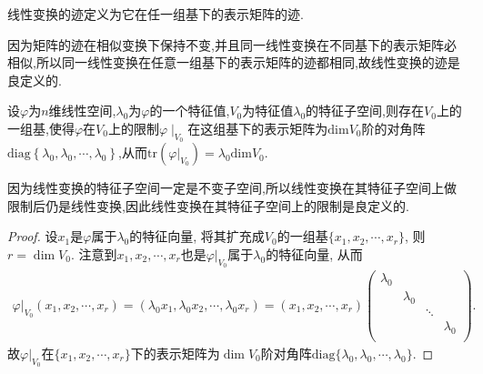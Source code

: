 \documentclass[../../main.tex]{subfiles}
\begin{document}
\begin{definition}[线性变换的迹]
线性变换的迹定义为它在任一组基下的表示矩阵的迹.
\end{definition}
\begin{note}
因为矩阵的迹在相似变换下保持不变,并且同一线性变换在不同基下的表示矩阵必相似,所以同一线性变换在任意一组基下的表示矩阵的迹都相同,故线性变换的迹是良定义的.
\end{note}

\begin{proposition}\label{proposition:线性变换在其特征子空间上的限制的表示矩阵及迹}
设$\varphi$为$n$维线性空间,$\lambda_0$为$\varphi$的一个特征值,$V_0$为特征值$\lambda_0$的特征子空间,则存在$V_0$上的一组基,使得$\varphi$在$V_0$上的限制$\varphi\mid_{V_0}$在这组基下的表示矩阵为$\mathrm{dim}V_0$阶的对角阵$\mathrm{diag}\left\{ \lambda _0,\lambda _0,\cdots ,\lambda _0 \right\}$,从而$\mathrm{tr}\left( \varphi |_{V_0} \right) =\lambda _0\mathrm{dim}V_0$.
\end{proposition}
\begin{remark}
因为线性变换的特征子空间一定是不变子空间,所以线性变换在其特征子空间上做限制后仍是线性变换,因此线性变换在其特征子空间上的限制是良定义的.
\end{remark}
\begin{proof}
设\(x_1\)是\(\varphi\)属于\(\lambda_0\)的特征向量, 将其扩充成\(V_0\)的一组基\(\{ x_1,x_2,\cdots ,x_r \}\), 则\(r = \dim V_0\).
注意到\(x_1,x_2,\cdots ,x_r\)也是\(\varphi|_{V_0}\)属于\(\lambda_0\)的特征向量, 从而
\begin{align*}
\varphi|_{V_0}( x_1,x_2,\cdots ,x_r )=(\lambda_0x_1,\lambda_0x_2,\cdots ,\lambda_0x_r)
=( x_1,x_2,\cdots ,x_r )\begin{pmatrix}
\lambda_0& & & \\
& \lambda_0& & \\
& & \ddots& \\
& & & \lambda_0\\
\end{pmatrix}.
\end{align*}
故\(\varphi|_{V_0}\)在\(\{ x_1,x_2,\cdots ,x_r \}\)下的表示矩阵为\(\dim V_0\)阶对角阵\(\mathrm{diag}\{ \lambda_0,\lambda_0,\cdots ,\lambda_0 \}\).
\end{proof}
\end{document}
